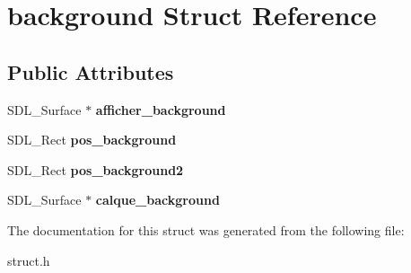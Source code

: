 \hypertarget{structbackground}{}\section{background Struct Reference}
\label{structbackground}
\subsection*{Public Attributes}
\begin{DoxyCompactItemize}
\item 
\mbox{\label{structbackground_a3c24a15deca9bb1811a284cd272a935c}} 
S\+D\+L\+\_\+\+Surface $\ast$ {\bfseries afficher\+\_\+background}
\item 
\mbox{\label{structbackground_a83515216626400ff398e1c81c5d641f5}} 
S\+D\+L\+\_\+\+Rect {\bfseries pos\+\_\+background}
\item 
\mbox{\label{structbackground_a5d49cc1bcd6914a6014cbf8efee705c2}} 
S\+D\+L\+\_\+\+Rect {\bfseries pos\+\_\+background2}
\item 
\mbox{\label{structbackground_a3cb332568004c1071a49fb58931a1904}} 
S\+D\+L\+\_\+\+Surface $\ast$ {\bfseries calque\+\_\+background}
\end{DoxyCompactItemize}


The documentation for this struct was generated from the following file\+:\begin{DoxyCompactItemize}
\item 
struct.\+h\end{DoxyCompactItemize}
